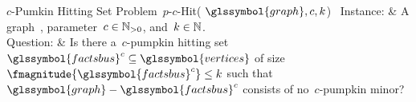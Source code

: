 \begin{problem}[framed]{$c$-Pumkin Hitting Set Problem~$p$-$c$-Hit(%
$\glssymbol{graph},c,k$)~\parencite{Jor11a,Jor11b}}%
    Instance: & A graph~, parameter~$c\in\mathbb{N}_{>0}$, 
    and~$k\in\mathbb{N}$.\\
    Question: & Is there a~$c$-pumpkin hitting
    set~$\glssymbol{factsbus}^c\subseteq\glssymbol{vertices}$
    of size~$\fmagnitude{\glssymbol{factsbus}^c}\leq k$ such
    that~$\glssymbol{graph}-\glssymbol{factsbus}^c$
    consists of no~$c$-pumpkin minor?
\end{problem}%
% 
% 
